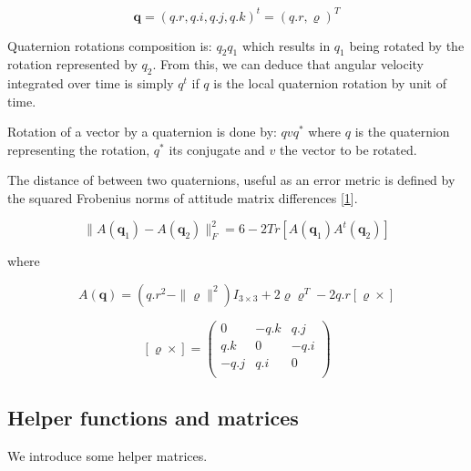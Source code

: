 \documentclass[12pt,]{article}
\begin{document}
\[\mathbf{q} = (q.r, q.i, q.j, q.k)^t = (q.r, \boldsymbol{\varrho})^T\]

Quaternion rotations composition is: \(q_2 q_1\) which results in
\(q_1\) being rotated by the rotation represented by \(q_2\). From this,
we can deduce that angular velocity integrated over time is simply
\(q^t\) if \(q\) is the local quaternion rotation by unit of time.

Rotation of a vector by a quaternion is done by: \(q v q^*\) where \(q\)
is the quaternion representing the rotation, \(q^*\) its conjugate and
\(v\) the vector to be rotated.

The distance of between two quaternions, useful as an error metric is
defined by the squared Frobenius norms of attitude matrix differences
{[}\protect\hyperlink{ref-markley_averaging_2007}{1}{]}.

\[\| A(\mathbf{q}_1) - A(\mathbf{q}_2) \|^2_F = 6 - 2 Tr [ A(\mathbf{q}_1)A^t(\mathbf{q}_2) ]\]

where

\[A(\mathbf{q}) = (q.r^2 - \| \boldsymbol{\varrho} \|^2) I_{3 \times 3} + 2\boldsymbol{\varrho} \boldsymbol{\varrho}^T - 2q.r[\boldsymbol{\varrho} \times]\]

\[[\boldsymbol{\varrho} \times] = \left( \begin{array}{ccc}
0 & -q.k & q.j \\
q.k & 0 & -q.i \\
-q.j & q.i & 0 \\
\end{array} \right)\]

\subsection{Helper functions and
matrices}\label{helper-functions-and-matrices}

We introduce some helper matrices.
\end{document}
